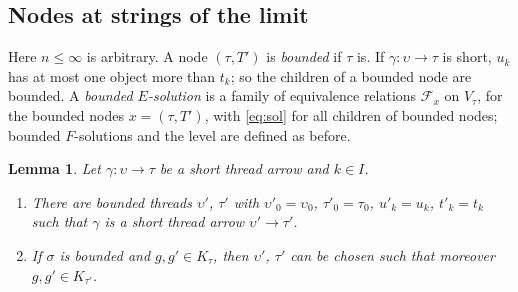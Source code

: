 \documentclass[11pt]{amsart}
\newtheorem{lem}[thm]{Lemma}
\theoremstyle{definition}
\begin{document}
\subsection*{Nodes at strings of the limit}
Here $n\le\infty$ is arbitrary. A node $(\tau,T')$ is \emph{bounded}
if $\tau$ is. If $\gamma\colon\upsilon\to\tau$ is short, $u_k$ has at
most one object more than $t_k$; so the children of a bounded node
are bounded. A \emph{bounded $E$-solution} is a family of equivalence
relations $\mathcal F_x$ on $V_\tau$, for the bounded nodes
$x=(\tau,T')$, with \eqref{eq:sol} for all children of bounded nodes;
bounded $F$-solutions and the level are defined as before.

\begin{lem}\label{lem:approx}
Let $\gamma\colon\upsilon\to\tau$ be a short thread arrow and $k\in
I$.
\begin{enumerate}
\item[(a)] There are bounded threads $\upsilon'$, $\tau'$ with
$\upsilon'_0=\upsilon_0$, $\tau'_0=\tau_0$, $u'_k=u_k$, $t'_k=t_k$
such that $\gamma$ is a short thread arrow $\upsilon'\to\tau'$.
\item[(b)] If $\sigma$ is bounded and $g,g'\in K_\tau$, then
$\upsilon'$, $\tau'$ can be chosen such that moreover $g,g'\in
K_{\tau'}$.
\end{enumerate}
\end{lem}
\end{document}
